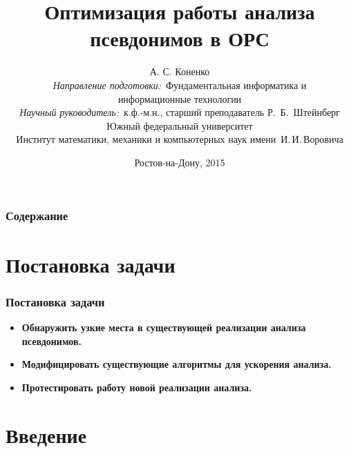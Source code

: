 \documentclass[utf8,russian]{beamer}
\title{\small{Оптимизация работы анализа псевдонимов в ОРС}}
\author{\small{%
А. С. Коненко\\%
\emph{Направление подготовки:}~Фундаментальная информатика и \\информационные технологии\\%
\emph{Научный руководитель:}~к.ф.-м.н., старший преподаватель Р.~Б.~Штейнберг}\\%
\vspace{15pt}%
    Южный федеральный университет\\
    Институт математики, механики и компьютерных наук
    имени~И.\,И.\,Воровича%
}
\date{\small{Ростов-на-Дону, 2015}}
\begin{document}
\begin{frame}
\titlepage %
\end{frame}

\begin{frame}
\frametitle{Содержание} %
\tableofcontents %
\end{frame}


\section{Постановка задачи}

\begin{frame}
\frametitle{Постановка задачи}
\begin{itemize}
  \item \textbf{Обнаружить узкие места в существующей реализации анализа псевдонимов.} 
  \item \textbf{Модифицировать существующие алгоритмы для ускорения анализа.} 
  \item \textbf{Протестировать работу новой реализации анализа.} 
\end{itemize}
\end{frame}

\section{Введение}
\end{document}
